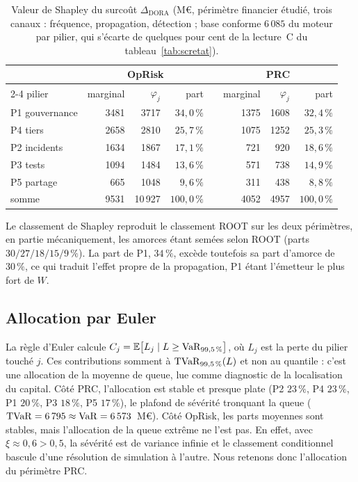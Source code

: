 \begin{table}[H]\centering\small
\renewcommand{\arraystretch}{1.25}
\begin{tabular}{@{}l rrr c rrr@{}}
\toprule
& \multicolumn{3}{c}{OpRisk} & & \multicolumn{3}{c}{PRC} \\
\cmidrule{2-4}\cmidrule{6-8}
pilier & marginal & $\varphi_j$ & part & & marginal & $\varphi_j$ & part \\
\midrule
P1 gouvernance & 3481 & 3717 & $34{,}0\,\%$ & & 1375 & 1608 & $32{,}4\,\%$ \\
P4 tiers       & 2658 & 2810 & $25{,}7\,\%$ & & 1075 & 1252 & $25{,}3\,\%$ \\
P2 incidents   & 1634 & 1867 & $17{,}1\,\%$ & &  721 &  920 & $18{,}6\,\%$ \\
P3 tests       & 1094 & 1484 & $13{,}6\,\%$ & &  571 &  738 & $14{,}9\,\%$ \\
P5 partage     &  665 & 1048 &  $9{,}6\,\%$ & &  311 &  438 &  $8{,}8\,\%$ \\
\midrule
somme          & 9531 & 10\,927 & $100{,}0\,\%$ & & 4052 & 4957 & $100{,}0\,\%$ \\
\bottomrule
\end{tabular}
\caption{Valeur de Shapley du surcoût $\Delta_{\text{DORA}}$ (M\euro, périmètre financier étudié, trois canaux : fréquence, propagation, détection ; base
conforme $6\,085$ du moteur par pilier, qui s'écarte de quelques pour cent de la lecture~C du tableau~\ref{tab:scretat}).}
\label{tab:shapley}
\end{table}

Le classement de Shapley reproduit le classement ROOT sur les deux périmètres, en partie
mécaniquement, les amorces étant semées selon ROOT (parts $30/27/18/15/9\,\%$). La part de P1,
$34\,\%$, excède toutefois sa part d'amorce de $30\,\%$, ce qui traduit l'effet propre de la
propagation, P1 étant l'émetteur le plus fort de $W$.

\subsection{Allocation par Euler}

La règle d'Euler \citep{tasche1999} calcule
$C_j = \mathbb{E}\bigl[L_j \mid L \ge \mathrm{VaR}_{99{,}5\,\%}\bigr]$, où $L_j$ est la perte du pilier touché
$j$. Ces contributions somment à $\mathrm{TVaR}_{99{,}5\,\%}(L)$ et non au quantile : c'est une allocation de
la moyenne de queue, lue comme diagnostic de la localisation du capital. Côté PRC, l'allocation est stable et presque plate (P2 $23\,\%$, P4 $23\,\%$, P1 $20\,\%$, P3
$18\,\%$, P5 $17\,\%$), le plafond de sévérité tronquant la queue ($\mathrm{TVaR} = 6\,795 \approx \mathrm{VaR} =
6\,573$~M\euro). Côté OpRisk, les parts moyennes sont stables, mais l'allocation de la queue
extrême ne l'est pas. En effet, avec $\xi \approx 0{,}6 > 0{,}5$, la sévérité est de variance infinie
et le classement conditionnel bascule d'une résolution de simulation à l'autre. Nous retenons donc
l'allocation du périmètre PRC.


